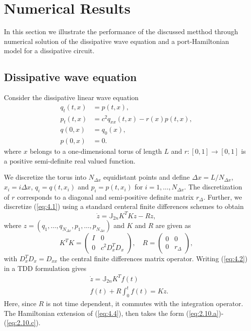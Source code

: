 \section{Numerical Results}
In this section we illustrate the performance of the discussed metthod through numerical solution of the dissipative wave equation and a port-Hamiltonian model for a dissipative circuit.

\subsection{Dissipative wave equation}

Consider the dissipative linear wave equation
\begin{equation} \label{eq:4.1}
	\begin{aligned}
		q_{t}(t,x) &= p(t,x), \\
		p_{t}(t,x) &= c^2 q_{xx}(t,x) - r(x)  p(t,x) , \\
		q(0,x) &= q_0(x), \\
		p(0,x) &= 0.
	\end{aligned}
\end{equation}
where $x$ belongs to a one-dimensional torus of length $L$ and $r:[0,1]\to[0,1]$ is a positive semi-definite real valued function. 

We discretize the torus into $N_{\Delta x}$ equidistant points and define $\Delta x = L/N_{\Delta x}$, $x_i = i\Delta x$, $q_i=q(t,x_i)$ and $p_i=p(t,x_i)$ for $i = 1, \dots, N_{\Delta x}$. The discretization of $r$ corresponds to a diagonal and semi-positive definite matrix $r_\Delta$. Further, we discretize (\ref{eq:4.1}) using a standard centeral finite differences schemes to obtain
\begin{equation} \label{eq:4.2}
	\dot z = \mathbb J_{2n} K^T K z - R z,
\end{equation}
where $z = (q_1,\dots,q_{N_{\Delta x}},p_1,\dots,p_{N_{\Delta x}})$ and $K$ and $R$ are given as
\begin{equation} \label{eq:4.3}
	K^T K =
	\begin{pmatrix}
		I & 0 \\
		0 & c^2D_x^TD_x
	\end{pmatrix} , \quad
	R =
	\begin{pmatrix}
		0 & 0 \\
		0 & r_\Delta
	\end{pmatrix},
\end{equation}
with $D_x^TD_x = D_{xx}$ the central finite differences matrix operator. Writing (\ref{eq:4.2}) in a TDD formulation gives
\begin{equation} \label{eq:4.4}
\begin{aligned}
	& \dot z = \mathbb J_{2n} K^T f(t) \\
	& f(t) + R \int_0^t f(t) = K z.
\end{aligned}
\end{equation}
Here, since $R$ is not time dependent, it commutes with the integration operator. The Hamiltonian extension of (\ref{eq:4.4}), then takes the form (\ref{eq:2.10.a})-(\ref{eq:2.10.c}).

